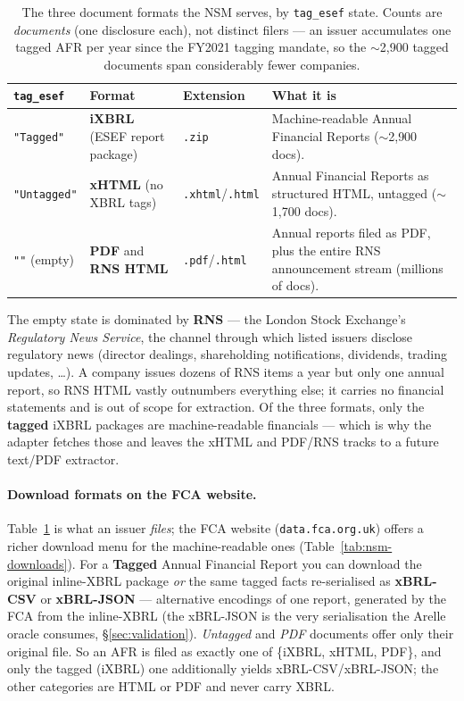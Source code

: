 \documentclass[11pt,a4paper]{report}
\begin{document}
\begin{table}[h]
\centering
\caption{The three document formats the NSM serves, by \texttt{tag\_esef} state. Counts are
\emph{documents} (one disclosure each), not distinct filers --- an issuer accumulates one tagged AFR
per year since the FY2021 tagging mandate, so the \(\sim\)2{,}900 tagged documents span considerably
fewer companies.}
\label{tab:nsm-formats}
\small
\begin{tabular}{@{}p{}p{}p{}p{}@{}}
\toprule
\textbf{\texttt{tag\_esef}} & \textbf{Format} & \textbf{Extension} & \textbf{What it is} \\
\midrule
\texttt{"Tagged"}   & \textbf{iXBRL} (ESEF report package) & \texttt{.zip}                  & Machine-readable Annual Financial Reports (\(\sim\)2{,}900 docs). \\
\texttt{"Untagged"} & \textbf{xHTML} (no XBRL tags)         & \texttt{.xhtml}/\texttt{.html} & Annual Financial Reports as structured HTML, untagged (\(\sim\)1{,}700 docs). \\
\texttt{""} (empty) & \textbf{PDF} and \textbf{RNS HTML}    & \texttt{.pdf}/\texttt{.html}   & Annual reports filed as PDF, plus the entire RNS announcement stream (millions of docs). \\
\bottomrule
\end{tabular}
\end{table}

\noindent The empty state is dominated by \textbf{RNS} --- the London Stock Exchange's
\emph{Regulatory News Service}, the channel through which listed issuers disclose regulatory news
(director dealings, shareholding notifications, dividends, trading updates, \ldots). A company issues
dozens of RNS items a year but only one annual report, so RNS HTML vastly outnumbers everything else;
it carries no financial statements and is out of scope for extraction. Of the three formats, only the
\textbf{tagged} iXBRL packages are machine-readable financials --- which is why the adapter fetches
those and leaves the xHTML and PDF/RNS tracks to a future text/PDF extractor.

\paragraph{Download formats on the FCA website.} Table~\ref{tab:nsm-formats} is what an issuer
\emph{files}; the FCA website (\texttt{data.fca.org.uk}) offers a richer download menu for the
machine-readable ones (Table~\ref{tab:nsm-downloads}). For a \textbf{Tagged} Annual Financial Report you
can download the original inline-XBRL package \emph{or} the same tagged facts re-serialised as
\textbf{xBRL-CSV} or \textbf{xBRL-JSON} --- alternative encodings of one report, generated by the FCA
from the inline-XBRL (the xBRL-JSON is the very serialisation the Arelle oracle consumes,
\S\ref{sec:validation}). \emph{Untagged} and \emph{PDF} documents offer only their original file. So an
AFR is filed as exactly one of \{iXBRL, xHTML, PDF\}, and only the tagged (iXBRL) one additionally
yields xBRL-CSV/xBRL-JSON; the other categories are HTML or PDF and never carry XBRL.
\end{document}

